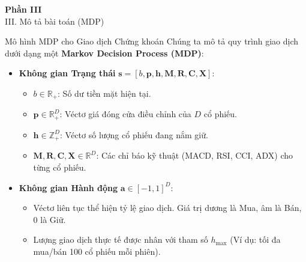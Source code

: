 \documentclass[10pt,aspectratio=169]{beamer}
\begin{document}
\begin{frame}[plain,c]
  \color{white}
  \centering
  \Huge \textbf{Phần III}\\
  \vspace{0.5cm}
  \Large \color{secondary} III. Mô tả bài toán (MDP)
\end{frame}

\begin{frame}{Mô hình MDP cho Giao dịch Chứng khoán}
  Chúng ta mô tả quy trình giao dịch dưới dạng một \textbf{Markov Decision Process (MDP)}:
  \vspace{0.3cm}
  \begin{itemize}
    \item \textbf{Không gian Trạng thái} $\mathbf{s} = [b, \mathbf{p}, \mathbf{h}, \mathbf{M}, \mathbf{R}, \mathbf{C}, \mathbf{X}]$:
    \begin{itemize}
      \item $b \in \mathbb{R}_+$: Số dư tiền mặt hiện tại.
      \item $\mathbf{p} \in \mathbb{R}^D_+$: Véctơ giá đóng cửa điều chỉnh của $D$ cổ phiếu.
      \item $\mathbf{h} \in \mathbb{Z}^D_+$: Véctơ số lượng cổ phiếu đang nắm giữ.
      \item $\mathbf{M}, \mathbf{R}, \mathbf{C}, \mathbf{X} \in \mathbb{R}^D$: Các chỉ báo kỹ thuật (MACD, RSI, CCI, ADX) cho từng cổ phiếu.
    \end{itemize}
    \vspace{0.1cm}
    \item \textbf{Không gian Hành động} $\mathbf{a} \in [-1, 1]^D$:
    \begin{itemize}
      \item Véctơ liên tục thể hiện tỷ lệ giao dịch. Giá trị dương là Mua, âm là Bán, $0$ là Giữ.
      \item Lượng giao dịch thực tế được nhân với tham số $h_{\max}$ (Ví dụ: tối đa mua/bán 100 cổ phiếu mỗi phiên).
    \end{itemize}
  \end{itemize}
\end{frame}
\end{document}
